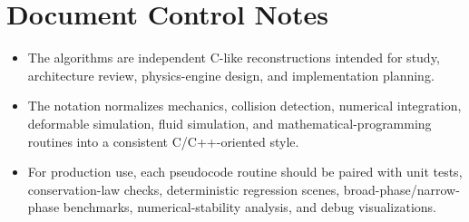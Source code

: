 \documentclass[10pt,letterpaper]{article}
\begin{document}
\clearpage
\section*{Document Control Notes}
{}
\begin{itemize}
\item The algorithms are independent C-like reconstructions intended for study, architecture review, physics-engine design, and implementation planning.
\item The notation normalizes mechanics, collision detection, numerical integration, deformable simulation, fluid simulation, and mathematical-programming routines into a consistent C/C++-oriented style.
\item For production use, each pseudocode routine should be paired with unit tests, conservation-law checks, deterministic regression scenes, broad-phase/narrow-phase benchmarks, numerical-stability analysis, and debug visualizations.
\end{itemize}
\end{document}
